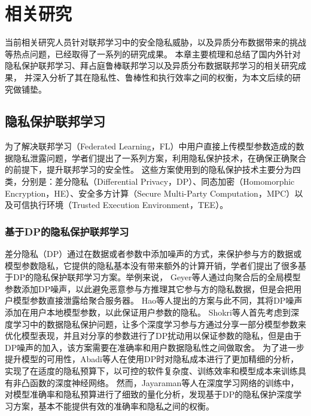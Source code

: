 \chapter{相关研究}
\label{chap:main}
当前相关研究人员针对联邦学习中的安全隐私威胁，以及异质分布数据带来的挑战等热点问题，已经取得了一系列的研究成果。
本章主要梳理和总结了国内外针对隐私保护联邦学习、拜占庭鲁棒联邦学习以及异质分布数据联邦学习的相关研究成果，
并深入分析了其在隐私性、鲁棒性和执行效率之间的权衡，为本文后续的研究做铺垫。

\section{隐私保护联邦学习}
\label{sec:ppfl}
为了解决联邦学习（Federated Learning，FL）中用户直接上传模型参数造成的数据隐私泄露问题，学者们提出了一系列方案，利用隐私保护技术，在确保正确聚合的前提下，提升联邦学习的安全性。
这些方案使用到的隐私保护技术主要分为四类，分别是：差分隐私（Differential Privacy，DP）\cite{dwork2006differential}、同态加密（Homomorphic Encryption，HE）\cite{gentry2013homomorphic}、安全多方计算（Secure Multi-Party Computation，MPC）\cite{shamir1979share}以及可信执行环境（Trusted Execution Environment，TEE）\cite{sabt2015trusted}。

\subsection{基于DP的隐私保护联邦学习}
差分隐私（DP）通过在数据或者参数中添加噪声的方式，来保护参与方的数据或模型参数隐私，它提供的隐私基本没有带来额外的计算开销，学者们提出了很多基于DP的隐私保护联邦学习方案\cite{agarwal2018cpsgd, choudhury2019differential, dubey2020differentially, geyer2017differentially, hao2019efficient, hao2019towards, hu2020personalized, rodriguez2020federated, triastcyn2019federated, wei2020federated}。举例来说，
Geyer等人\cite{geyer2017differentially}通过向聚合后的全局模型参数添加DP噪声，以此避免恶意参与方推理其它参与方的隐私数据，但是会把用户模型参数直接泄露给聚合服务器。
Hao等人\cite{hao2019efficient}提出的方案与此不同，其将DP噪声添加在用户本地模型参数，以此保证用户参数的隐私。
Shokri等人\cite{shokri2015privacy}首先考虑到深度学习中的数据隐私保护问题，让多个深度学习参与方通过分享一部分模型参数来优化模型表现，并且对分享的参数进行了DP扰动用以保证参数的隐私，但是由于DP噪声的加入，该方案需要在准确率和用户数据隐私性之间做取舍。
为了进一步提升模型的可用性，Abadi等人\cite{abadi2016deep}在使用DP时对隐私成本进行了更加精细的分析，实现了在适度的隐私预算下，以可控的软件复杂度、训练效率和模型成本来训练具有非凸函数的深度神经网络。
然而，Jayaraman等人\cite{jayaraman2019evaluating}在深度学习网络的训练中，对模型准确率和隐私预算进行了细致的量化分析，发现基于DP的隐私保护深度学习方案，基本不能提供有效的准确率和隐私之间的权衡。


